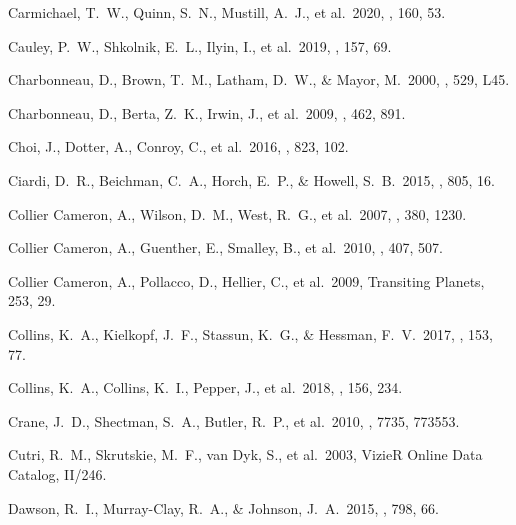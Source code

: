  Carmichael, T.~W., Quinn, S.~N., Mustill, A.~J., et al.\ 2020, \aj, 160, 53.

 Cauley, P.~W., Shkolnik, E.~L., Ilyin, I., et al.\ 2019, \aj, 157, 69.

 Charbonneau, D., Brown, T.~M., Latham, D.~W., \& Mayor, M.\ 2000, \apjl, 529, L45.

 Charbonneau, D., Berta, Z.~K., Irwin, J., et al.\ 2009, \nat, 462, 891.

 Choi, J., Dotter, A., Conroy, C., et al.\ 2016, \apj, 823, 102.

 Ciardi, D.~R., Beichman, C.~A., Horch, E.~P., \& Howell, S.~B.\ 2015, \apj, 805, 16.

 Collier Cameron, A., Wilson, D.~M., West, R.~G., et al.\ 2007, \mnras, 380, 1230.

 Collier Cameron, A., Guenther, E., Smalley, B., et al.\ 2010, \mnras, 407, 507.

 Collier Cameron, A., Pollacco, D., Hellier, C., et al.\ 2009, Transiting Planets, 253, 29.

 Collins, K.~A., Kielkopf, J.~F., Stassun, K.~G., \& Hessman, F.~V.\ 2017, \aj, 153, 77.

 Collins, K.~A., Collins, K.~I., Pepper, J., et al.\ 2018, \aj, 156, 234.


 Crane, J.~D., Shectman, S.~A., Butler, R.~P., et al.\ 2010, \procspie, 7735, 773553.

 Cutri, R.~M., Skrutskie, M.~F., van Dyk, S., et al.\ 2003, VizieR Online Data Catalog, II/246.

 Dawson, R.~I., Murray-Clay, R.~A., \& Johnson, J.~A.\ 2015, \apj, 798, 66.

